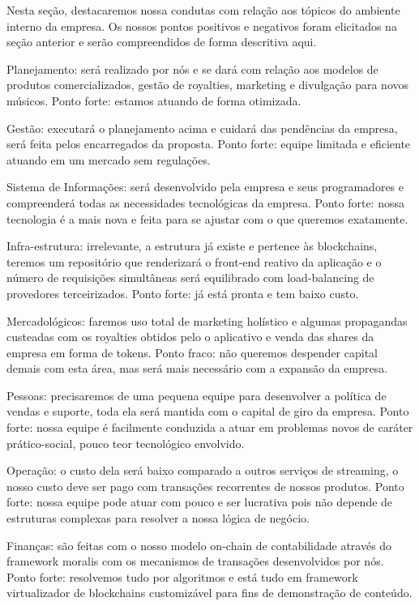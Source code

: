 \documentclass[onecolumn,12pt]{asme2ej}
\begin{document}
Nesta seção, destacaremos nossa condutas com relação aos tópicos do ambiente interno da empresa. Os nossos pontos positivos e negativos foram elicitados na seção anterior e serão compreendidos de forma descritiva aqui.

Planejamento: será realizado por nós e se dará com relação aos modelos de produtos comercializados, gestão de royalties, marketing e divulgação para novos músicos. Ponto forte: estamos atuando de forma otimizada.

Gestão: executará o planejamento acima e cuidará das pendências da empresa, será feita pelos encarregados da proposta. Ponto forte: equipe limitada e eficiente atuando em um mercado sem regulações.

Sistema de Informações: será desenvolvido pela empresa e seus programadores e compreenderá todas as necessidades tecnológicas da empresa. Ponto forte: nossa tecnologia é a mais nova e feita para se ajustar com o que queremos exatamente.

Infra-estrutura: irrelevante, a estrutura já existe e pertence às blockchains, teremos um repositório que renderizará o front-end reativo da aplicação e o número de requisições simultâneas será equilibrado com load-balancing de provedores terceirizados. Ponto forte: já está pronta e tem baixo custo.

Mercadológicos: faremos uso total de marketing holístico e algumas propagandas custeadas com os royalties obtidos pelo o aplicativo e venda das shares da empresa em forma de tokens. Ponto fraco: não queremos despender capital demais com esta área, mas será mais necessário com a expansão da empresa.

Pessoas: precisaremos de uma pequena equipe para desenvolver a política de vendas e suporte, toda ela será mantida com o capital de giro da empresa. Ponto forte: nossa equipe é facilmente conduzida a atuar em problemas novos de caráter prático-social, pouco teor tecnológico envolvido.

Operação: o custo dela será baixo comparado a outros serviços de streaming, o nosso custo deve ser pago com transações recorrentes de nossos produtos. Ponto forte: nossa equipe pode atuar com pouco e ser lucrativa pois não depende de estruturas complexas para resolver a nossa lógica de negócio.

Finanças: são feitas com o nosso modelo on-chain de contabilidade através do framework moralis com os mecanismos de transações desenvolvidos por nós. Ponto forte: resolvemos tudo por algoritmos e está tudo em framework virtualizador de blockchains customizável para fins de demonstração de conteúdo.
\end{document}
